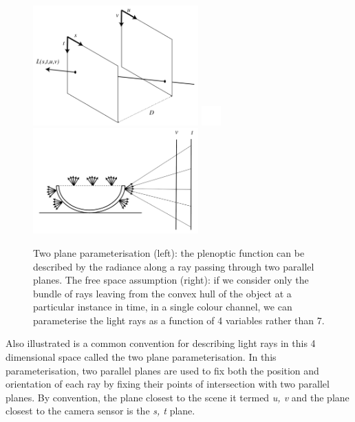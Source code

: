 \documentclass[openany]{book}
\begin{document}
\begin{figure}[htbp]
    \centering
    \includegraphics[width=2.5in]{images/2pp.png}
    \includegraphics[width=0.3in]{images/blank.png}
    \includegraphics[width=2.5in]{images/convexhull.png}
    
    \caption{Two plane parameterisation (left): the plenoptic function can be described by the radiance along a ray passing through two parallel planes. The free space assumption (right): if we consider only the bundle of rays leaving from the convex hull of the object at a particular instance in time, in a single colour channel, we can parameterise the light rays as a function of 4 variables rather than 7.}
    
    \label{convexhull}
\end{figure}

Also illustrated is a common convention for describing light rays in this 4 dimensional space called the two plane parameterisation. In this parameterisation, two parallel planes are used to fix both the position and orientation of each ray by fixing their points of intersection with two parallel planes. By convention, the plane closest to the scene it termed \textit{u, v} and the plane closest to the camera sensor is the \textit{s, t} plane.
\end{document}
